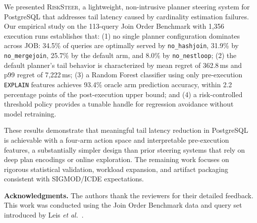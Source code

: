 \documentclass[sigconf,natbib=false]{article}
\newcommand{\postgres}{PostgreSQL}
\newcommand{\arm}[1]{\texttt{#1}}
\newcommand{\sys}{\textsc{RiskSteer}}
\newcommand{\etal}{\textit{et al.}}
\begin{document}
We presented \sys{}, a lightweight, non-intrusive planner steering system for \postgres{}
that addresses tail latency caused by cardinality estimation failures. Our empirical study
on the 113-query Join Order Benchmark with 1{,}356 execution runs establishes that: (1) no
single planner configuration dominates across JOB: 34.5\% of queries are optimally served by
\arm{no\_hashjoin}, 31.9\% by \arm{no\_mergejoin}, 25.7\% by the default arm, and 8.0\% by \arm{no\_nestloop};
(2) the default planner's tail behavior is characterized by mean regret of 362.8\,ms and p99
regret of 7{,}222\,ms; (3) a Random Forest classifier using only pre-execution \texttt{EXPLAIN}
features achieves 93.4\% oracle arm prediction accuracy, within 2.2 percentage points of the
post-execution upper bound; and (4) a risk-controlled threshold policy provides a tunable
handle for regression avoidance without model retraining.

These results demonstrate that meaningful tail latency reduction in \postgres{} is achievable
with a four-arm action space and interpretable pre-execution features, a substantially
simpler design than prior steering systems that rely on deep plan encodings or online
exploration. The remaining work focuses on rigorous statistical validation, workload
expansion, and artifact packaging consistent with SIGMOD/ICDE expectations.

\vspace{6pt}
\noindent\textbf{Acknowledgments.} The authors thank the reviewers for their detailed
feedback. This work was conducted using the Join Order Benchmark data and query set introduced
by Leis \etal~\cite{Leis2015}.

\end{document}
